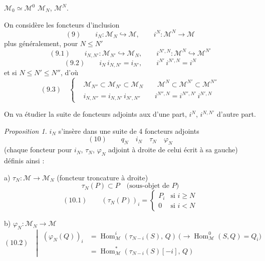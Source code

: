 \documentclass[11pt,a4paper]{article}
\begin{document}
\struck{\ill{}}  \ill{} $\mathcal{M}_0\simeq\mathcal{M}^0$  \ill{}  \struck{\ill{}} $\mathcal{M}_N$, $\mathcal{M}^N$.

On considère les foncteurs d'inclusion
\[
(9)\qquad i_N : \mathcal{M}_N\hookrightarrow\mathcal{M}, \qquad i^N : \mathcal{M}^N\to\mathcal{M}
\]
plus généralement, pour $N\leq N'$
\[
(9.1)\qquad i_{N,N'} : \mathcal{M}_{N'}\hookrightarrow\mathcal{M}_N, \qquad i^{N',N} : \mathcal{M}^N\hookrightarrow\mathcal{M}^{N'}
\]
\[
(9.2)\qquad i_N\, i_{N,N'} = i_{N'}, \qquad i^{N'}\, i^{N',N} = i^N
\]
 et si $N\leq N'\leq N''$, d'où
\[
(9.3)\quad
\left\{\begin{aligned}
&\mathcal{M}_{N''}\subset\mathcal{M}_{N'}\subset\mathcal{M}_N \qquad \mathcal{M}^N\subset\mathcal{M}^{N'}\subset\mathcal{M}^{N''}\\
&i_{N,N''} = i_{N,N'}\, i_{N',N''} \qquad i^{N'',N} = i^{N'',N'}\, i^{N',N}
\end{aligned}\right.
\]

On va étudier la suite de foncteurs adjoints aux  d'une part, $i^N$, $i^{N,N'}$ d'autre part.

\emph{Proposition 1.} $i_N$  s'insère dans une suite de 4 foncteurs adjoints
\[
(10)\qquad q_N \quad i_N \quad \tau_N \quad \varphi_N
\]
(chaque foncteur  pour $i_N$, $\tau_N$, $\varphi_N$ adjoint à droite de celui écrit à sa gauche) définis ainsi :

a) $\tau_N : \mathcal{M}\to\mathcal{M}_N$ (foncteur troncature à droite)
\[
\tau_N(P) \subset P \quad\text{(sous-objet de $P$)}
\]
\[
(10.1)\qquad (\tau_N(P))_i = \begin{cases} P_i & \text{si } i\geq N\\ 0 & \text{si } i<N \end{cases}
\]

b) $\varphi_N : \mathcal{M}_N\to\mathcal{M}$
\[
(10.2)\quad
\left|\;\begin{aligned}
(\varphi_N(Q))_i &= \operatorname{Hom}^i_{\mathcal{M}}(\tau_{N-i}(S),\, Q)
\ \bigl(\longrightarrow \operatorname{Hom}^0_{\mathcal{M}}(S,Q) = Q_i\bigr)\\
&= \operatorname{Hom}^*_{\mathcal{M}}(\tau_{N-i}(S)[-i],\, Q)
\end{aligned}\right.
\]
\end{document}
